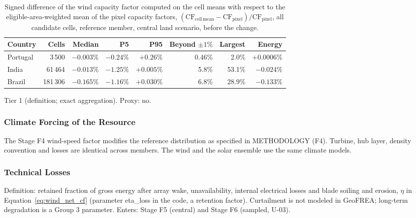 \begin{table}[htbp]
    \centering
    \caption{Signed difference of the wind capacity factor computed on the cell means
    with respect to the eligible-area-weighted mean of the pixel capacity factors,
    $(\mathrm{CF}_{\mathrm{cell\,mean}}-\mathrm{CF}_{\mathrm{pixel}})/\mathrm{CF}_{\mathrm{pixel}}$,
    all candidate cells, reference member, central land scenario, before the change.}
    \label{tab:g1_pixel_bias}
    \small
    \begin{tabular}{lrrrrrrr}
        \toprule
        Country & Cells & Median & P5 & P95 & Beyond $\pm1\%$ & Largest & Energy \\
        \midrule
        Portugal & 3\,500   & $-0.003\%$ & $-0.24\%$ & $+0.26\%$ & 0.46\% & 2.0\%  & $+0.0006\%$ \\
        India    & 61\,464  & $-0.013\%$ & $-1.25\%$ & $+0.005\%$ & 5.8\% & 53.1\% & $-0.024\%$ \\
        Brazil   & 181\,306 & $-0.165\%$ & $-1.16\%$ & $+0.030\%$ & 6.8\% & 28.9\% & $-0.133\%$ \\
        \bottomrule
    \end{tabular}
\end{table}

Tier 1 (definition; exact aggregation). Proxy: no.

\subsubsection{Climate Forcing of the Resource}

The Stage F4 wind-speed factor modifies the reference distribution as
specified in METHODOLOGY (F4). Turbine, hub layer, density convention and
losses are identical across members. The wind and the solar ensemble use the same climate models.

\subsubsection{Technical Losses}

Definition: retained fraction of gross energy after array wake,
unavailability, internal electrical losses and blade soiling and erosion,
$\eta$ in Equation~\ref{eq:wind_net_cf} (parameter eta\_loss in the
code, a retention factor). Curtailment is not modeled in GeoFREA;
long-term degradation is a Group 3 parameter. Enters: Stage F5 (central)
and Stage F6 (sampled, U-03).

